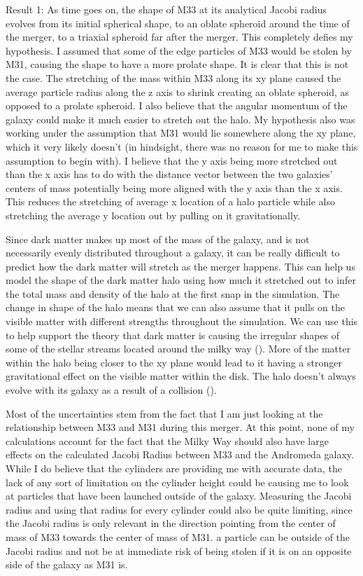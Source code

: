 \documentclass[fleqn,usenatbib]{mnras}
\begin{document}
Result 1:
	As time goes on, the shape of M33 at its analytical Jacobi radius evolves from its initial spherical shape, to an oblate spheroid around the time of the merger, to a triaxial spheroid far after the merger. This completely defies my hypothesis. I assumed that some of the edge particles of M33 would be stolen by M31, causing the shape to have a more prolate shape. It is clear that this is not the case. The stretching of the mass within M33 along its xy plane caused the average particle radius along the z axis to shrink creating an oblate spheroid, as opposed to a prolate spheroid. I also believe that the angular momentum of the galaxy could make it much easier to stretch out the halo. My hypothesis also was working under the assumption that M31 would lie somewhere along the xy plane, which it very likely doesn’t (in hindsight, there was no reason for me to make this assumption to begin with). I believe that the y axis being more stretched out than the x axis has to do with the distance vector between the two galaxies' centers of mass potentially being more aligned with the y axis than the x axis. This reduces the stretching of average x location of a halo particle while also stretching the average y location out by pulling on it gravitationally.

    Since dark matter makes up most of the mass of the galaxy, and is not necessarily evenly distributed throughout a galaxy, it can be really difficult to predict how the dark matter will stretch as the merger happens. This can help us model the shape of the dark matter halo using how much it stretched out to infer the total mass and density of the halo at the first snap in the simulation. The change in shape of the halo means that we can also assume that it pulls on the visible matter with different strengths throughout the simulation. We can use this to help support the theory that dark matter is causing the irregular shapes of some of the stellar streams located around the milky way (\citet{Banik2018}). More of the matter within the halo being closer to the xy plane would lead to it having a stronger gravitational effect on the visible matter within the disk. The halo doesn’t always evolve with its galaxy as a result of a collision (\citet{Clowe2006}).

    Most of the uncertainties stem from the fact that I am just looking at the relationship between M33 and M31 during this merger. At this point, none of my calculations account for the fact that the Milky Way should also have large effects on the calculated Jacobi Radius between M33 and the Andromeda galaxy. While I do believe that the cylinders are providing me with accurate data, the lack of any sort of limitation on the cylinder height could be causing me to look at particles that have been launched outside of the galaxy. Measuring the Jacobi radius and using that radius for every cylinder could also be quite limiting, since the Jacobi radius is only relevant in the direction pointing from the center of mass of M33 towards the center of mass of M31. a particle can be outside of the Jacobi radius and not be at immediate risk of being stolen if it is on an opposite side of the galaxy as M31 is.
\end{document}
